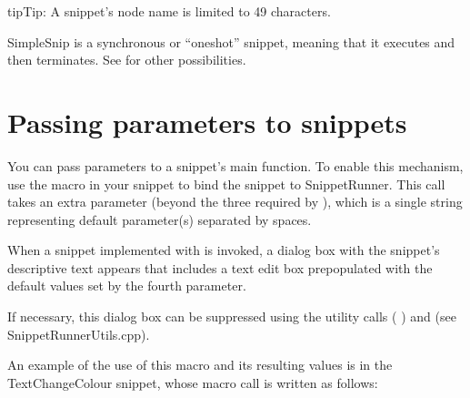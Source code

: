 \documentclass[letterpaper,12pt,english,openany,oneside]{sphinxmanual}
\begin{document}
\begin{sphinxadmonition}{tip}{Tip:}
A snippet’s node name is limited to 49 characters.
\end{sphinxadmonition}

SimpleSnip is a synchronous or “one\sphinxhyphen{}shot” snippet, meaning that it executes and then terminates. See  for other possibilities.




\section{Passing parameters to snippets}
\label{\detokenize{Snippet_WritingSnippets:passing-parameters-to-snippets}}
You can pass parameters to a snippet’s main function. To enable this mechanism, use the  macro in your snippet to bind the snippet to SnippetRunner. This call takes an extra parameter (beyond the three required by  ), which is a single string representing default parameter(s) separated by spaces.

When a snippet implemented with  is invoked, a dialog box with the snippet’s descriptive text appears that includes a text edit box pre\sphinxhyphen{}populated with the default values set by the fourth parameter.

If necessary, this dialog box can be suppressed using the utility calls  ( ) and  (see SnippetRunnerUtils.cpp).

An example of the use of this macro and its resulting values is in the TextChangeColour snippet, whose macro call is written as follows:

\begin{sphinxVerbatim}[commandchars=\\\{\}]
 
              
          
\end{sphinxVerbatim}
\end{document}
